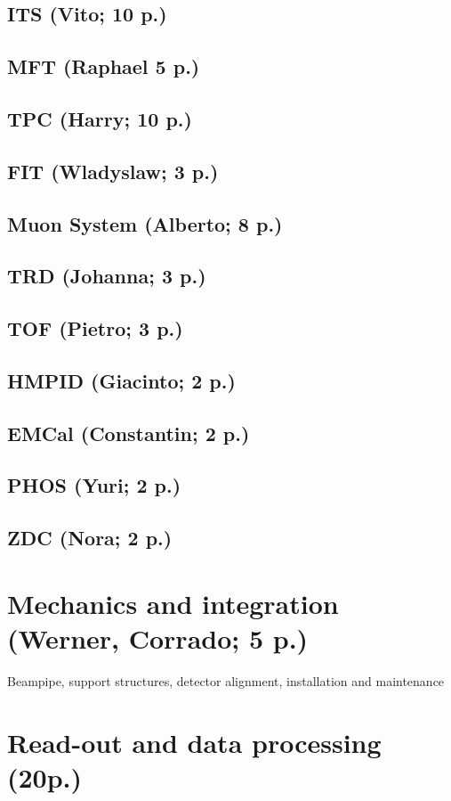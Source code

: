 \documentclass[ALICE,manyauthors]{cernphprep}
\begin{document}
\subsection{ITS (Vito; 10 p.)}
\subsection{MFT (Raphael 5 p.)}
\subsection{TPC (Harry; 10 p.)}
\subsection{FIT (Wladyslaw; 3 p.)}
\subsection{Muon System (Alberto; 8 p.)}
\subsection{TRD (Johanna; 3 p.)}
\subsection{TOF (Pietro; 3 p.)}
\subsection{HMPID (Giacinto; 2 p.)}
\subsection{EMCal (Constantin; 2 p.)}
\subsection{PHOS (Yuri; 2 p.)}
\subsection{ZDC (Nora; 2 p.)}

\section{Mechanics and integration (Werner, Corrado; 5 p.)}
Beampipe, support structures, detector alignment, installation and maintenance

\section{Read-out and data processing (20p.)}
\end{document}
